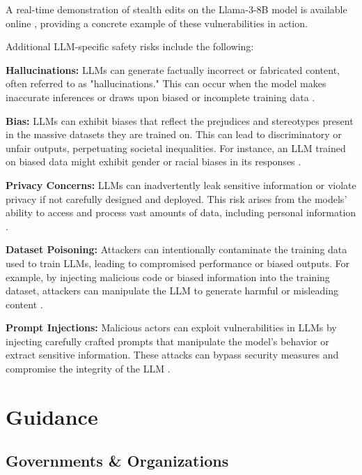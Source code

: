 A real-time demonstration of stealth edits on the Llama-3-8B model is available online , providing a concrete example of these vulnerabilities in action.

Additional LLM-specific safety risks include the following:

\textbf{Hallucinations:} LLMs can generate factually incorrect or fabricated content, often referred to as "hallucinations." This can occur when the model makes inaccurate inferences or draws upon biased or incomplete training data .

\textbf{Bias:} LLMs can exhibit biases that reflect the prejudices and stereotypes present in the massive datasets they are trained on. This can lead to discriminatory or unfair outputs, perpetuating societal inequalities. For instance, an LLM trained on biased data might exhibit gender or racial biases in its responses .

\textbf{Privacy Concerns:} LLMs can inadvertently leak sensitive information or violate privacy if not carefully designed and deployed. This risk arises from the models' ability to access and process vast amounts of data, including personal information .  

\textbf{Dataset Poisoning:} Attackers can intentionally contaminate the training data used to train LLMs, leading to compromised performance or biased outputs. For example, by injecting malicious code or biased information into the training dataset, attackers can manipulate the LLM to generate harmful or misleading content .

\textbf{Prompt Injections:} Malicious actors can exploit vulnerabilities in LLMs by injecting carefully crafted prompts that manipulate the model's behavior or extract sensitive information. These attacks can bypass security measures and compromise the integrity of the LLM .

\section{Guidance}

\subsection{Governments \& Organizations}

